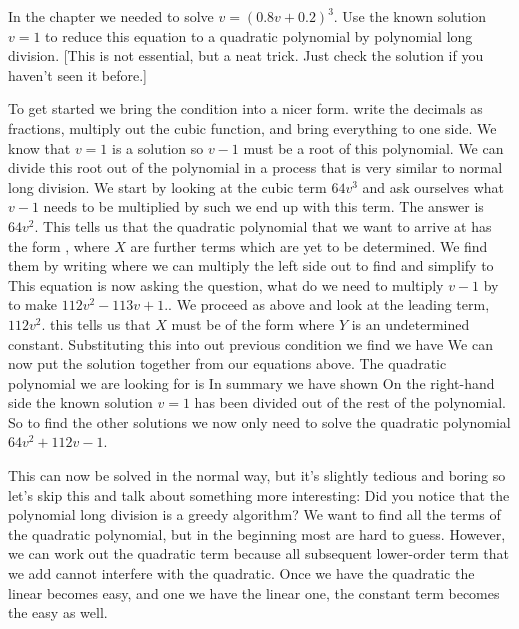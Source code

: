 \label{exAttackPolyLong}In the chapter we needed to solve $v=(0.8v+0.2)^3$. Use the known solution $v=1$ to reduce this equation to a quadratic polynomial by polynomial long division. [This is not essential, but a neat trick. Just check the solution if you haven't seen it before.]

\solution
To get started we bring the condition into a nicer form. write the decimals as fractions, multiply out the cubic function, and bring everything to one side. 
We know that $v=1$ is a solution so $v-1$ must be a root of this polynomial. We can divide this root out of the polynomial in a process that is very similar to normal long division. We start by looking at the cubic term $64v^3$ and ask ourselves what $v-1$ needs to be multiplied by such we end up with this term. The answer is $64v^2$. This tells us that the quadratic polynomial that we want to arrive at has the form 
, where $X$ are further terms which are yet to be determined. We find them by writing 
where we can multiply the left side out to find
and simplify to 
This equation is now asking the question, what do we need to multiply $v-1$ by to make $112v^2-113v+1.$. We proceed as above and look at the leading term, $112v^2$. this tells us that $X$ must be of the form 
where $Y$ is an undetermined constant. Substituting this into out previous condition we find we have
We can now put the solution together from our equations above. The quadratic polynomial we are looking for is  
In summary we have shown
On the right-hand side the known solution $v=1$ has been divided out of the rest of the polynomial. So to find the other solutions we now only need to solve the quadratic polynomial 
$64v^2+112v-1$. 

This can now be solved in the normal way, but it's slightly tedious and boring so let's skip this and talk about something more interesting: Did you notice that the polynomial long division is a greedy algorithm? We want to find all the terms of the quadratic polynomial, but in the beginning most are hard to guess. However, we can work out the quadratic term because all subsequent lower-order term that we add cannot interfere with the quadratic. Once we have the quadratic the linear becomes easy, and one we have the linear one, the constant term becomes the easy as well. 